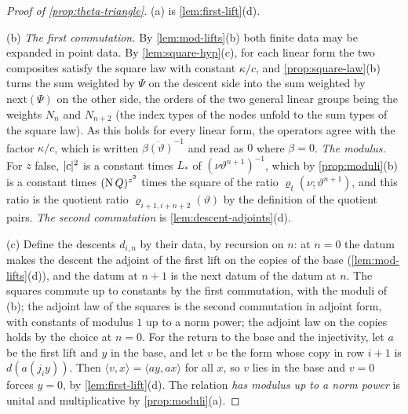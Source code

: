\begin{proof}[Proof of \cref{prop:theta-triangle}]
(a) is \cref{lem:first-lift}(d).

(b) \emph{The first commutation.} By \cref{lem:mod-lifts}(b) both finite data may be expanded in point data. By \cref{lem:square-hyp}(c), for each linear form the two composites satisfy the square law with constant $\kappa/c$,
and \cref{prop:square-law}(b) turns the sum weighted by $\Psi$ on the descent side into the sum weighted by $\mathrm{next}(\Psi)$ on the other side, the orders of the two general linear groups being the weights
$N_n$ and $N_{n+2}$ (the index types of the nodes unfold to the sum types of the square law). As this holds for every linear form, the operators agree with the factor $\kappa/c$, which is written
$\overline{\beta(\vartheta)}^{-1}$ and read as $0$ where $\beta=0$. \emph{The modulus.} For $z$ false, $\lvert c\rvert^2$ is a constant times $L_*$ of $(\nu\vartheta^{n+1})^{-1}$, which by \cref{prop:moduli}(b) is a constant times $(\operatorname{N} Q)^{z^2}$ times the square of
the ratio $\varrho_{t}(\nu;\vartheta^{n+1})$, and this ratio is the quotient ratio $\varrho_{i+1,i+n+2}(\vartheta)$ by the definition of the quotient pairs. \emph{The second commutation} is \cref{lem:descent-adjoints}(d).

(c) Define the descents $d_{i,n}$ by their data, by recursion on $n$: at $n=0$ the datum makes the descent the adjoint of the first lift on the copies of the base (\cref{lem:mod-lifts}(d)), and the datum at $n+1$ is
the next datum of the datum at $n$. The squares commute up to constants by the first commutation, with the moduli of (b); the adjoint law of the squares is the second commutation in adjoint form, with constants
of modulus $1$ up to a norm power; the adjoint law on the copies holds by the choice at $n=0$. For the return to the base and the injectivity, let $a$ be the first lift and $y$ in the base, and let $v$ be the form
whose copy in row $i+1$ is $d(a(j_iy))$. Then $\langle v,x\rangle=\langle ay,ax\rangle$ for all $x$, so $v$ lies in the base and $v=0$ forces $y=0$, by \cref{lem:first-lift}(d). The relation \emph{has modulus up to a
norm power} is unital and multiplicative by \cref{prop:moduli}(a).


\end{proof}
